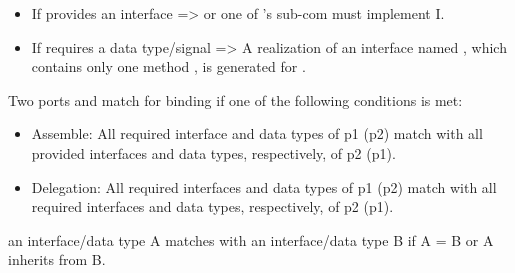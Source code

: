 	




\begin{itemize}
	
	
	\item If  provides an interface  =>  or one of 's sub-com must implement I. 
	
	\item If  requires a data type/signal  => A realization of an interface named , which contains only one method , is generated for .
	
	
\end{itemize}


Two ports  and  match for binding if one of the following conditions is met:
\begin{itemize}
	\item Assemble: All required interface and data types of p1 (p2) match with all provided interfaces and data types, respectively, of p2 (p1).
	
	\item Delegation: All required interfaces and data types of p1 (p2) match with all required interfaces and data types, respectively, of p2 (p1).
\end{itemize}

\noindent
{} an interface/data type A matches with an interface/data type B if A = B or A inherits from B.

